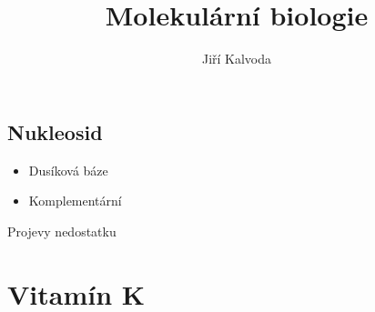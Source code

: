 \documentclass[a4]{article}
\title{Molekulární biologie}
\author{Jiří Kalvoda}
\begin{document}
\maketitle
\subsection{Nukleosid}
\begin{itemize}
	\item Dusíková báze
	\item Komplementární 
\end{itemize}

Projevy nedostatku
\section{Vitamín K}
\end{document}

